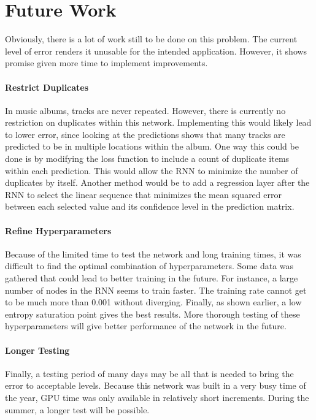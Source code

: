 \documentclass{article}
\begin{document}
\section{Future Work}
Obviously, there is a lot of work still to be done on this problem. The current level of error renders it unusable for the intended application. However, it shows promise given more time to implement improvements.

\paragraph{Restrict Duplicates} In music albums, tracks are never repeated. However, there is currently no restriction on duplicates within this network. Implementing this would likely lead to lower error, since looking at the predictions shows that many tracks are predicted to be in multiple locations within the album. One way this could be done is by modifying the loss function to include a count of duplicate items within each prediction. This would allow the RNN to minimize the number of duplicates by itself. Another method would be to add a regression layer after the RNN to select the linear sequence that minimizes the mean squared error between each selected value and its confidence level in the prediction matrix.

\paragraph{Refine Hyperparameters} Because of the limited time to test the network and long training times, it was difficult to find the optimal combination of hyperparameters. Some data was gathered that could lead to better training in the future. For instance, a large number of nodes in the RNN seems to train faster. The training rate cannot get to be much more than 0.001 without diverging. Finally, as shown earlier, a low entropy saturation point gives the best results. More thorough testing of these hyperparameters will give better performance of the network in the future.

\paragraph{Longer Testing} Finally, a testing period of many days may be all that is needed to bring the error to acceptable levels. Because this network was built in a very busy time of the year, GPU time was only available in relatively short increments. During the summer, a longer test will be possible.
\end{document}
